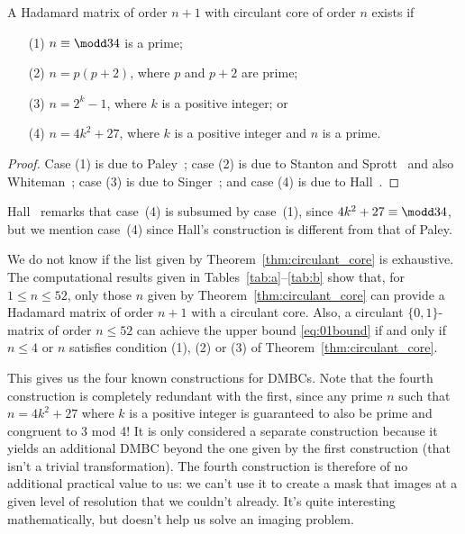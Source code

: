 \begin{theorem}
\label{thm:circulant_core}
A Hadamard matrix of order $n+1$ with circulant core of order $n$ 
exists if
\begin{itemize}
\item[(1)] $n \equiv \modd 3 4$ is a prime;
\item[(2)] $n = p(p+2)$, where $p$ and $p+2$ are prime;
\item[(3)] $n = 2^k-1$, where $k$ is a positive integer; or
\item[(4)] $n = 4k^2 + 27$, where $k$ is a positive integer
		and $n$ is a prime.
\end{itemize}
\end{theorem}
\begin{proof}
Case (1) is due to Paley~\cite{Paley33}; 
case (2) is due to Stanton and Sprott~\cite{Stanton58} and
also Whiteman~\cite{Whiteman62};
case (3) is due to Singer~\cite{Singer38};
and case (4) is due to Hall~\cite[Theorem 2.2]{Hall56}.
\end{proof}

Hall~\cite[p.~$980$]{Hall56} remarks
that case~(4) %
is subsumed by case~(1), since $4k^2+27 \equiv \modd 3 4$, 
but we mention case~(4) since
Hall's construction is different from that of Paley.

We do not know if the list given by Theorem~\ref{thm:circulant_core} is
exhaustive.  The computational results given in
Tables~\ref{tab:a}--\ref{tab:b} show that, for $1 \le n \le 52$,
only those $n$
given by Theorem~\ref{thm:circulant_core} can provide a Hadamard matrix of
order $n+1$ with a circulant core.
Also, a circulant $\{0,1\}$-matrix of order $n \le 52$ can achieve the upper
bound \eqref{eq:01bound} if and only if $n \le 4$ or $n$ satisfies condition
(1), (2) or (3) of Theorem~\ref{thm:circulant_core}.
 
This gives us the four known constructions for DMBCs. Note that the fourth construction is completely redundant with the first, since any prime $n$ such that $n = 4k^2 + 27$ where $k$ is a positive integer is guaranteed to also be prime and congruent to 3 mod 4! It is only considered a separate construction because it yields an additional DMBC beyond the one given by the first construction (that isn't a trivial transformation). The fourth construction is therefore of no additional practical value to us: we can't use it to create a mask that images at a given level of resolution that we couldn't already. It's quite interesting mathematically, but doesn't help us solve an imaging problem.

